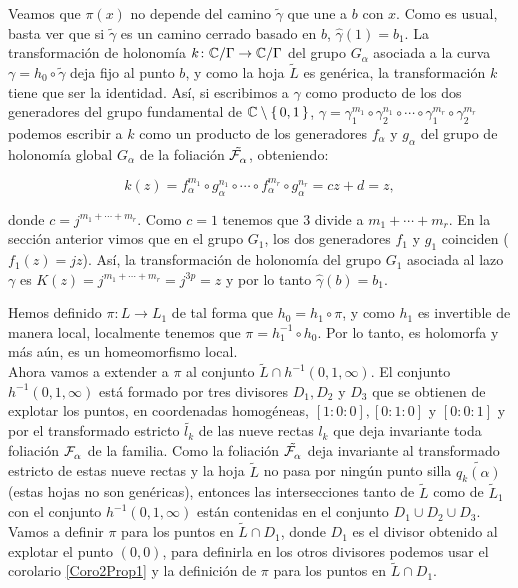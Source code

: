 Veamos que $\pi(x)$ no depende del camino $\tilde{\gamma}$ que une a $b$ con $x$. Como es usual, basta ver que si $\tilde{\gamma}$ es un camino cerrado basado en $b$, $\hat{\gamma}(1)=b_{1}$. La transformación de holonomía $k\colon\mathbb{C}/\Gamma\rightarrow\mathbb{C}/\Gamma$ del grupo $G_{\alpha}$ asociada a la curva $\gamma=h_{0}\circ\tilde{\gamma}$ deja fijo al punto $b$, y como la hoja $\tilde{L}$ es genérica, la transformación $k$ tiene que ser la identidad. Así, si escribimos a $\gamma$ como producto de los dos generadores del grupo fundamental de $\mathbb{C}\setminus\{\, 0,1\, \}$, $\gamma=\gamma_{1}^{m_{1}}\circ\gamma_{2}^{n_{1}}\circ\cdots\circ\gamma_{1}^{m_{r}}\circ\gamma_{2}^{m_{r}}$ podemos escribir a $k$ como un producto de los generadores $f_{\alpha}$ y $g_{\alpha}$ del grupo de holonomía global $G_{\alpha}$ de la foliación $\tilde{\mathcal{F}^{\ }_{\alpha}}$, obteniendo:

$$k(z)=f_{\alpha}^{m_{1}}\circ g_{\alpha}^{n_{1}}\circ\cdots\circ f_{\alpha}^{m_{r}}\circ g_{\alpha}^{n_{r}}=cz+d=z,$$

\noindent donde $c=j^{m_{1}+\cdots+m_{r}}$. Como $c=1$ tenemos que $3$ divide a $m_{1}+\cdots+m_{r}$. En la sección anterior vimos que en el grupo $G_{1}$, los dos generadores $f_{1}$ y $g_{1}$ coinciden ($f_{1}(z)=jz$). Así, la transformación de holonomía del grupo $G_{1}$ asociada al lazo $\gamma$ es $K(z)=j^{m_{1}+\cdots+m_{r}}=j^{3p}=z$ y por lo tanto $\hat{\gamma}(b)=b_{1}$.

Hemos definido $\pi\colon L\rightarrow L_{1}$ de tal forma que $h_{0}=h_{1}\circ\pi$, y como $h_{1}$ es invertible de manera local, localmente tenemos que $\pi=h_{1}^{-1}\circ h_{0}$. Por lo tanto, es holomorfa y más aún, es un homeomorfismo local.\\

Ahora vamos a extender a $\pi$ al conjunto $\tilde{L}\cap h^{-1}(0,1,\infty)$. El conjunto $h^{-1}(0,1,\infty)$ está formado por tres divisores $D_{1},D_{2}$ y $D_{3}$ que se obtienen de explotar los puntos, en coordenadas homogéneas, $[1:0:0],[0:1:0]$ y $[0:0:1]$ y por el transformado estricto $\tilde{\mathit{l}_{k}}$ de las nueve rectas $\mathit{l}_{k}$ que deja invariante toda foliación $\mathcal{F}^{\ }_{\alpha}$ de la familia. Como la foliación $\tilde{\mathcal{F}^{\ }_{\alpha}}$ deja invariante al transformado estricto de estas nueve rectas y la hoja $\tilde{L}$ no pasa por ningún punto silla $\tilde{q_{k}(\alpha)}$ (estas hojas no son genéricas), entonces las intersecciones tanto de $\tilde{L}$ como de $\tilde{L}_{1}$ con el conjunto $h^{-1}(0,1,\infty)$ están contenidas en el conjunto $D_{1}\cup D_{2}\cup D_{3}$. Vamos a definir $\pi$ para los puntos en $\tilde{L}\cap D_{1}$, donde $D_{1}$ es el divisor obtenido al explotar el punto $(0,0)$, para definirla en los otros divisores podemos usar el corolario \ref{Coro2Prop1} y la definición de $\pi$ para los puntos en $\tilde{L}\cap D_{1}$.\\

